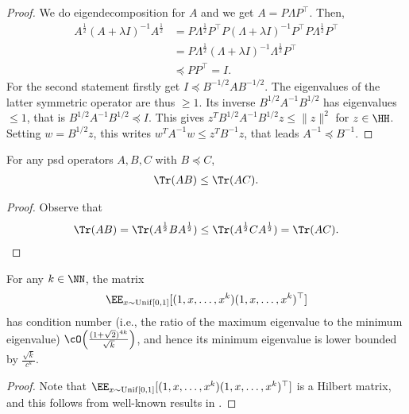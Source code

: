 \documentclass[12pt,a4paper,pdftex,onepage]{article}
\begin{document}
\begin{proof}
We do eigendecomposition for $A$ and we get $A = P \Lambda P^\top$. 
Then, 
\begin{align*}
A^{\frac{1}{2}}(A+\lambda I)^{-1} A^{\frac{1}{2}} &= P \Lambda^{\frac{1}{2}} P^\top P (\Lambda + \lambda I)^{-1} P^\top  P \Lambda^{\frac{1}{2}} P^\top  \\
&= P \Lambda^{\frac{1}{2}}(\Lambda + \lambda I)^{-1}\Lambda^{\frac{1}{2}} P^\top \\
&\preceq PP^\top = I.
\end{align*}
For the second statement firstly get $I \preceq B^{-1 / 2} A B^{-1 / 2}$. 
The eigenvalues of the latter symmetric operator are thus $\geq 1$. Its inverse $B^{1 / 2} A^{-1} B^{1 / 2}$ has eigenvalues $\leq 1$, that is $B^{1 / 2} A^{-1} B^{1 / 2} \preceq I$. This gives $z^T B^{1 / 2} A^{-1} B^{1 / 2} z \leq\|z\|^2$ for $z \in \HH$. 
Setting $w=B^{1 / 2} z$, this writes $w^T A^{-1} w \leq z^T B^{-1} z$, that leads $A^{-1} \preceq B^{-1}$.  
\end{proof}

\begin{lemma}\label{lemma; trace simple inequality}
For any psd operators \(A,B,C\) with \(B \preceq C\), 
\begin{align*}
\Tr(AB) \leq \Tr(AC).
\end{align*}    
\end{lemma}

\begin{proof}
Observe that 
\begin{align*}
\Tr(AB) = \Tr(A^{\frac{1}{2}} BA^{\frac{1}{2}}) \leq \Tr(A^{\frac{1}{2}} CA^{\frac{1}{2}}) = \Tr(AC).
\end{align*}
\end{proof}

\begin{lemma}\label{lemma; key constant LPR}
For any \(k \in \NN\), the matrix
\[
\EE_{x \sim \operatorname{Unif}[0,1]}[(1,x, \dots, x^k)(1,x, \dots, x^k)^\top]
\]
has condition number (i.e., the ratio of the maximum eigenvalue to the minimum eigenvalue) \(\cO\!\left(\frac{(1+\sqrt{2})^{4k}}{\sqrt{k}}\right)\), and hence its minimum eigenvalue is lower bounded by \(\frac{\sqrt{k}}{c^k}\).
\end{lemma}

\begin{proof}
Note that \(\EE_{x \sim \operatorname{Unif}[0,1]}[(1,x, \dots, x^k)(1,x, \dots, x^k)^\top]\) is a Hilbert matrix, and this follows from well-known results in \citet{choi1983tricks}.
\end{proof}
    
\end{document}
